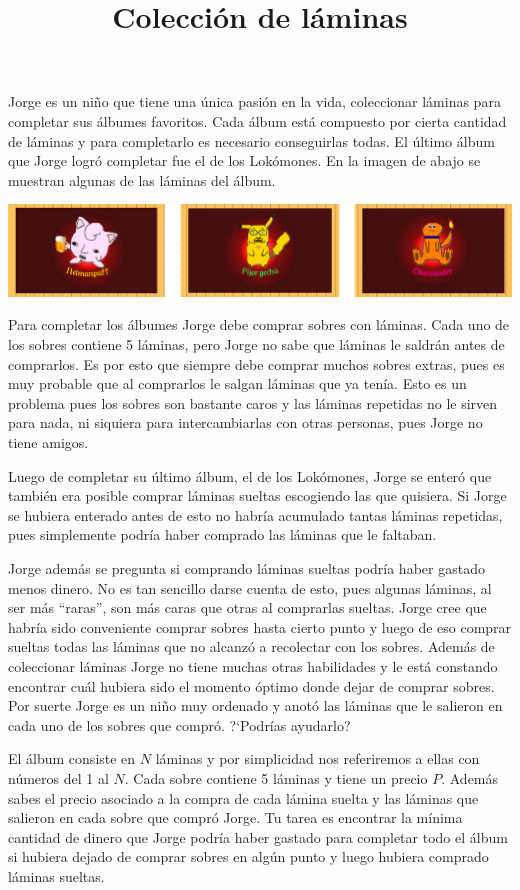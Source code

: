 \documentclass{oci}
\title{Colección de láminas}
\begin{document}
\begin{problemDescription}
Jorge es un niño que tiene una única pasión en la vida, coleccionar láminas para completar sus álbumes favoritos.
Cada álbum está compuesto por cierta cantidad de láminas y para completarlo es necesario conseguirlas todas.
El último álbum que Jorge logró completar fue el de los Lokómones.
En la imagen de abajo se muestran algunas de las láminas del álbum.

\begin{center}
\includegraphics[scale=0.5]{locomons-laminas.png}
\end{center}

Para completar los álbumes Jorge debe comprar sobres con láminas.
Cada uno de los sobres contiene 5 láminas, pero Jorge no sabe que láminas le saldrán antes de comprarlos.
Es por esto que siempre debe comprar muchos sobres extras, pues es muy probable que al comprarlos le salgan láminas que ya tenía.
Esto es un problema pues los sobres son bastante caros y las láminas repetidas no le sirven para nada, ni siquiera para intercambiarlas con otras personas, pues Jorge no tiene amigos.

Luego de completar su último álbum, el de los Lokómones, Jorge se enteró que también era posible comprar láminas sueltas escogiendo las que quisiera.
Si Jorge se hubiera enterado antes de esto no habría acumulado tantas láminas repetidas, pues simplemente podría haber comprado las láminas que le faltaban.

Jorge además se pregunta si comprando láminas sueltas podría haber gastado menos dinero.
No es tan sencillo darse cuenta de esto, pues algunas láminas, al ser más ``raras'', son más caras que otras al comprarlas sueltas.
Jorge cree que habría sido conveniente comprar sobres hasta cierto punto y luego de eso comprar sueltas todas las láminas que no alcanzó a recolectar con los sobres.
Además de coleccionar láminas Jorge no tiene muchas otras habilidades y le está constando encontrar cuál hubiera sido el momento óptimo donde dejar de comprar sobres.
Por suerte Jorge es un niño muy ordenado y anotó las láminas que le salieron en cada uno de los sobres que compró. ?`Podrías ayudarlo?

El álbum consiste en $N$ láminas y por simplicidad nos referiremos a ellas con números del 1 al $N$.
Cada sobre contiene 5 láminas y tiene un precio $P$.
Además sabes el precio asociado a la compra de cada lámina suelta y las láminas que salieron en cada sobre que compró Jorge.
Tu tarea es encontrar la mínima cantidad de dinero que Jorge podría haber gastado para completar todo el álbum si hubiera dejado de comprar sobres en algún punto y luego hubiera comprado láminas sueltas.
\end{problemDescription}
\end{document}
